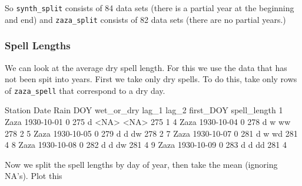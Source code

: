 \documentclass{article}
\begin{document}
So  {\tt synth\_split} consists of 84 data sets (there is a partial
year at the beginning and end) and {\tt zaza\_split}
consists of 82 data sets (there are no partial years.)

\subsubsection{Spell Lengths}

We can look at the average dry spell length.  For this we use the data
that has not been spit into years.  First we take only dry spells.
To do this, take only rows of {\tt zaza\_spell} that correspond to a dry
day.  

\begin{Schunk}
\begin{Soutput}
  Station       Date Rain DOY wet_or_dry lag_1 lag_2 first_DOY spell_length
1    Zaza 1930-10-01    0 275          d  <NA>  <NA>       275            1
4    Zaza 1930-10-04    0 278          d     w    ww       278            2
5    Zaza 1930-10-05    0 279          d     d    dw       278            2
7    Zaza 1930-10-07    0 281          d     w    wd       281            4
8    Zaza 1930-10-08    0 282          d     d    dw       281            4
9    Zaza 1930-10-09    0 283          d     d    dd       281            4
\end{Soutput}
\end{Schunk}

Now we split the spell lengths by day of year, 
then take the mean (ignoring NA's).  Plot this
\end{document}
